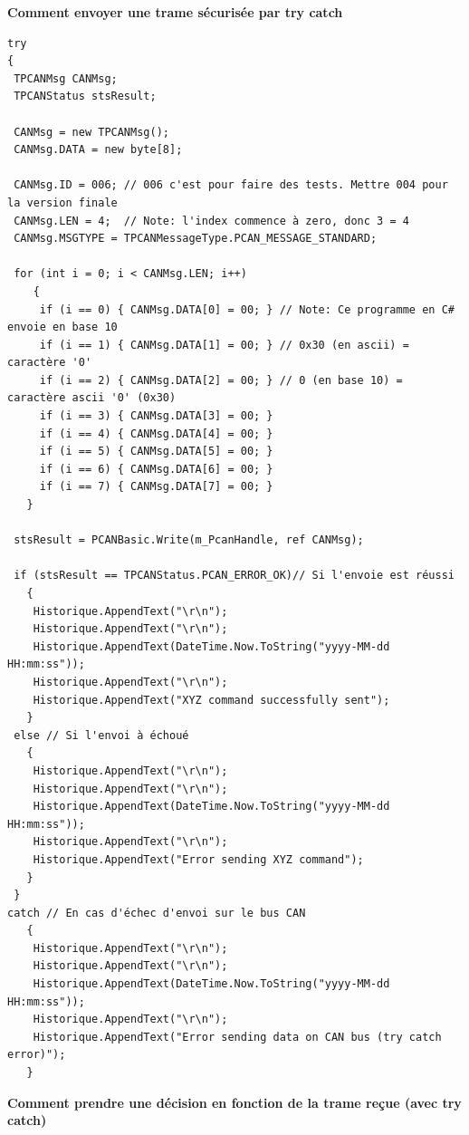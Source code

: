 \documentclass[10pt,a4paper,final]{article}
\begin{document}
\textbf{Comment envoyer une trame sécurisée par try catch}
\begin{lstlisting}
try
{
 TPCANMsg CANMsg;
 TPCANStatus stsResult;

 CANMsg = new TPCANMsg();
 CANMsg.DATA = new byte[8];

 CANMsg.ID = 006; // 006 c'est pour faire des tests. Mettre 004 pour la version finale
 CANMsg.LEN = 4;  // Note: l'index commence à zero, donc 3 = 4
 CANMsg.MSGTYPE = TPCANMessageType.PCAN_MESSAGE_STANDARD;

 for (int i = 0; i < CANMsg.LEN; i++)
    {
     if (i == 0) { CANMsg.DATA[0] = 00; } // Note: Ce programme en C# envoie en base 10
     if (i == 1) { CANMsg.DATA[1] = 00; } // 0x30 (en ascii) = caractère '0'
     if (i == 2) { CANMsg.DATA[2] = 00; } // 0 (en base 10) = caractère ascii '0' (0x30)
     if (i == 3) { CANMsg.DATA[3] = 00; } 
     if (i == 4) { CANMsg.DATA[4] = 00; } 
     if (i == 5) { CANMsg.DATA[5] = 00; } 
     if (i == 6) { CANMsg.DATA[6] = 00; }
     if (i == 7) { CANMsg.DATA[7] = 00; }               
   }

 stsResult = PCANBasic.Write(m_PcanHandle, ref CANMsg);

 if (stsResult == TPCANStatus.PCAN_ERROR_OK)// Si l'envoie est réussi
   {
    Historique.AppendText("\r\n");
    Historique.AppendText("\r\n");
    Historique.AppendText(DateTime.Now.ToString("yyyy-MM-dd HH:mm:ss"));
    Historique.AppendText("\r\n");
    Historique.AppendText("XYZ command successfully sent");   
   }
 else // Si l'envoi à échoué
   {
    Historique.AppendText("\r\n");
    Historique.AppendText("\r\n");
    Historique.AppendText(DateTime.Now.ToString("yyyy-MM-dd HH:mm:ss"));
    Historique.AppendText("\r\n");
    Historique.AppendText("Error sending XYZ command");  
   }
 }
catch // En cas d'échec d'envoi sur le bus CAN
   {
    Historique.AppendText("\r\n");
    Historique.AppendText("\r\n");
    Historique.AppendText(DateTime.Now.ToString("yyyy-MM-dd HH:mm:ss"));
    Historique.AppendText("\r\n");
    Historique.AppendText("Error sending data on CAN bus (try catch error)"); 
   }
\end{lstlisting}
\pagebreak
\textbf{Comment prendre une décision en fonction de la trame reçue (avec try catch)}
\end{document}
